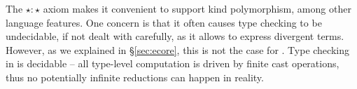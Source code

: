The $\star : \star$ axiom makes it convenient to support kind polymorphism, among other language features. One concern is that it often causes type checking to be undecidable, if not dealt with carefully, as it allows to express divergent terms. However, as we explained in \S\ref{sec:ecore}, this is not the case for \name. Type checking in \name is decidable -- all type-level computation is driven by finite cast operations, thus no potentially infinite reductions can happen in reality.




